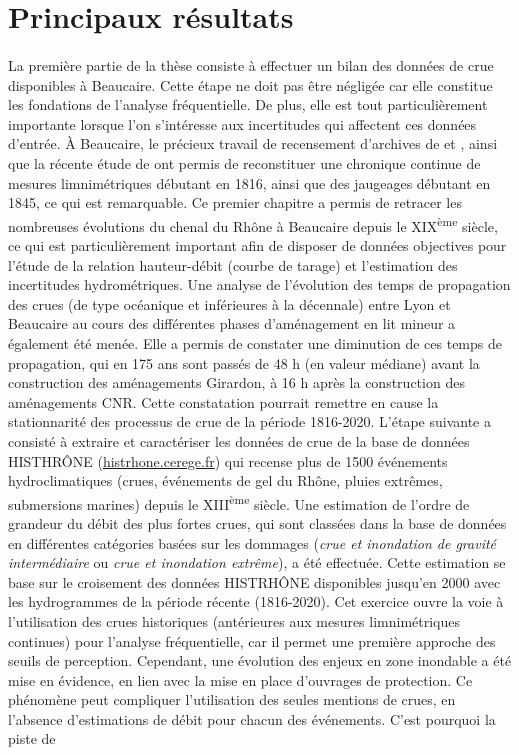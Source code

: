	\section{Principaux résultats}
	
	\paragraph{} La première partie de la thèse consiste à effectuer un bilan des données de crue disponibles à Beaucaire. Cette étape ne doit pas être négligée car elle constitue les fondations de l'analyse fréquentielle. De plus, elle est tout particulièrement importante lorsque l'on s'intéresse aux incertitudes qui affectent ces données d'entrée. À Beaucaire, le précieux travail de recensement d'archives de \citet{pichard_les_1995} et \citet{pichard_hydro-climatology_2017}, ainsi que la récente étude de \citet{bard_actualisation_2018} ont permis de reconstituer une chronique continue de mesures limnimétriques débutant en 1816, ainsi que des jaugeages débutant en 1845, ce qui est remarquable. Ce premier chapitre a permis de retracer les nombreuses évolutions du chenal du Rhône à Beaucaire depuis le XIX\textsuperscript{ème} siècle, ce qui est particulièrement important afin de disposer de données objectives pour l'étude de la relation hauteur-débit (courbe de tarage) et l'estimation des incertitudes hydrométriques. Une analyse de l'évolution des temps de propagation des crues (de type océanique et inférieures à la décennale) entre Lyon et Beaucaire au cours des différentes phases d'aménagement en lit mineur a également été menée. Elle a permis de constater une diminution de ces temps de propagation, qui en 175 ans sont passés de 48 h (en valeur médiane) avant la construction des aménagements Girardon, à 16 h après la construction des aménagements CNR. Cette constatation pourrait remettre en cause la stationnarité des processus de crue de la période 1816-2020. L'étape suivante a consisté à extraire et caractériser les données de crue de la base de données HISTHRÔNE (\url{histrhone.cerege.fr}) qui recense plus de 1500 événements hydroclimatiques (crues, événements de gel du Rhône, pluies extrêmes, submersions marines) depuis le XIII\textsuperscript{ème} siècle. Une estimation de l'ordre de grandeur du débit des plus fortes crues, qui sont classées dans la base de données en différentes catégories basées sur les dommages (\og \textit{crue et inondation de gravité intermédiaire}\fg{} ou \og \textit{crue et inondation extrême}\fg{}), a été effectuée. Cette estimation se base sur le croisement des données HISTRHÔNE disponibles jusqu'en 2000 avec les hydrogrammes de la période récente (1816-2020). Cet exercice ouvre la voie à l'utilisation des crues historiques (antérieures aux mesures limnimétriques continues) pour l'analyse fréquentielle, car il permet une première approche des seuils de perception. Cependant, une évolution des enjeux en zone inondable a été mise en évidence, en lien avec la mise en place d'ouvrages de protection. Ce phénomène peut compliquer l'utilisation des seules mentions de crues, en l'absence d'estimations de débit pour chacun des événements. C'est pourquoi la piste de 